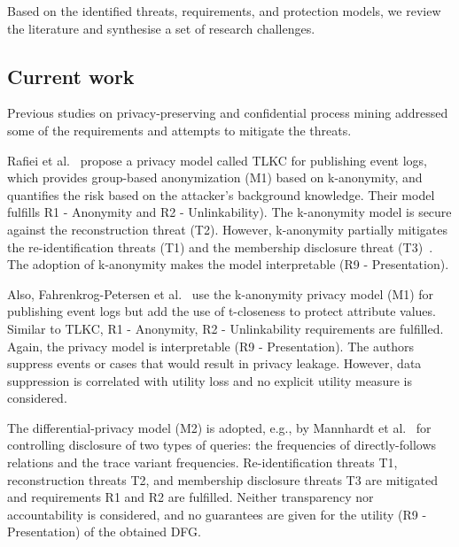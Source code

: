 \documentclass[manuscript]{acmart}
\begin{document}
Based on the identified threats, requirements, and protection models, we review the literature and synthesise a set of research challenges. 

\subsection{Current work}
Previous studies on privacy-preserving and confidential process mining addressed some of the requirements and attempts to mitigate the threats. 

Rafiei et al.~\cite{rafiei2020tlkc} propose a privacy model called TLKC for publishing event logs, which provides group-based anonymization (M1) based on k-anonymity, and quantifies the risk based on the attacker's background knowledge. Their model fulfills R1 - Anonymity and R2 - Unlinkability). The k-anonymity model is secure against the reconstruction threat (T2). However, k-anonymity partially mitigates the re-identification threats (T1) and the membership disclosure threat (T3)~\cite{cohen2020towards}. The adoption of k-anonymity makes the model interpretable (R9 - Presentation). 

Also, Fahrenkrog-Petersen et al.~\cite{fahrenkrog2019pretsa,bauer2019elpaas} use the k-anonymity privacy model (M1) for publishing event logs but add the use of t-closeness to protect attribute values.
Similar to TLKC, R1 - Anonymity, R2 - Unlinkability requirements are fulfilled. Again, the privacy model is interpretable (R9 - Presentation). The authors suppress events or cases that would result in privacy leakage. However, data suppression is correlated with utility loss and no explicit utility measure is considered.

The differential-privacy model (M2) is adopted, e.g., by Mannhardt et al.~\cite{mannhardt2019privacy} for controlling disclosure of two types of queries: the frequencies of directly-follows relations and the trace variant frequencies. Re-identification threats T1, reconstruction threats T2, and membership disclosure threats T3 are mitigated and requirements R1 and R2 are fulfilled. Neither transparency nor accountability is considered, and no guarantees are given for the utility (R9 - Presentation) of the obtained DFG.

\end{document}
